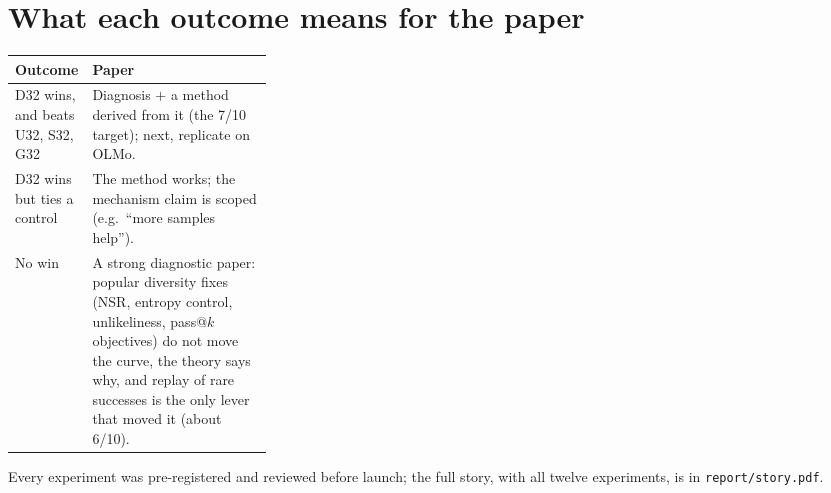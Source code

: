 \documentclass[11pt]{article}
\begin{document}
\section{What each outcome means for the paper}
\begin{tabularx}{\linewidth}{@{}p{0.3\linewidth}Y@{}}
\toprule
Outcome & Paper\\
\midrule
D32 wins, and beats U32, S32, G32 & Diagnosis $+$ a method derived from it (the 7/10 target); next, replicate on OLMo.\\
D32 wins but ties a control & The method works; the mechanism claim is scoped (e.g.\ ``more samples help'').\\
No win & A strong diagnostic paper: popular diversity fixes (NSR, entropy control, unlikeliness, pass@$k$ objectives) do not move the curve, the theory says why, and replay of rare successes is the only lever that moved it (about 6/10).\\
\bottomrule
\end{tabularx}

\vspace{4pt}
\small Every experiment was pre-registered and reviewed before launch; the full story, with all twelve experiments, is in \texttt{report/story.pdf}.
\end{document}
